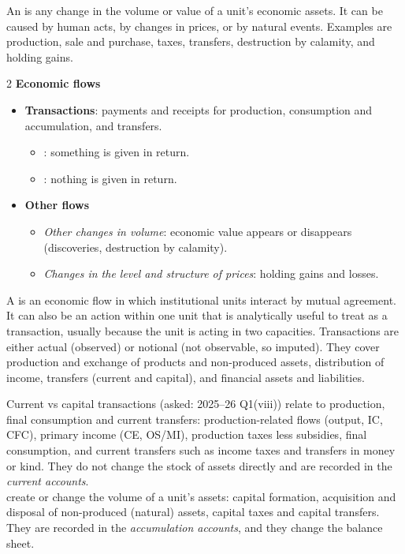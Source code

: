 An  is any change in the volume or value of a unit's economic assets. It can be
caused by human acts, by changes in prices, or by natural events. Examples are production, sale
and purchase, taxes, transfers, destruction by calamity, and holding gains.

\begin{multicols}{2}\small
\textbf{Economic flows}
\begin{itemize}
\item \textbf{Transactions}: payments and receipts for production, consumption and accumulation,
  and transfers.
  \begin{itemize}
  \item {}: something is given in return.
  \item {}: nothing is given in return.
  \end{itemize}
\columnbreak
\item \textbf{Other flows}
  \begin{itemize}
  \item \emph{Other changes in volume}: economic value appears or disappears (discoveries,
    destruction by calamity).
  \item \emph{Changes in the level and structure of prices}: holding gains and losses.
  \end{itemize}
\end{itemize}
\end{multicols}

A  is an economic flow in which institutional units interact by mutual agreement.
It can also be an action within one unit that is analytically useful to treat as a transaction,
usually because the unit is acting in two capacities. Transactions are either actual (observed)
or notional (not observable, so imputed). They cover production and exchange of products and
non-produced assets, distribution of income, transfers (current and capital), and financial
assets and liabilities.

\begin{keybox}{Current vs capital transactions (asked: 2025--26 Q1(viii))}
\small
{} relate to production, final consumption and current transfers:
production-related flows (output, IC, CFC), primary income (CE, OS/MI), production taxes less
subsidies, final consumption, and current transfers such as income taxes and transfers in money
or kind. They do not change the stock of assets directly and are recorded in the \emph{current
accounts}.\\[2pt]
 create or change the volume of a unit's assets: capital formation,
acquisition and disposal of non-produced (natural) assets, capital taxes and capital transfers.
They are recorded in the \emph{accumulation accounts}, and they change the balance sheet.
\end{keybox}

